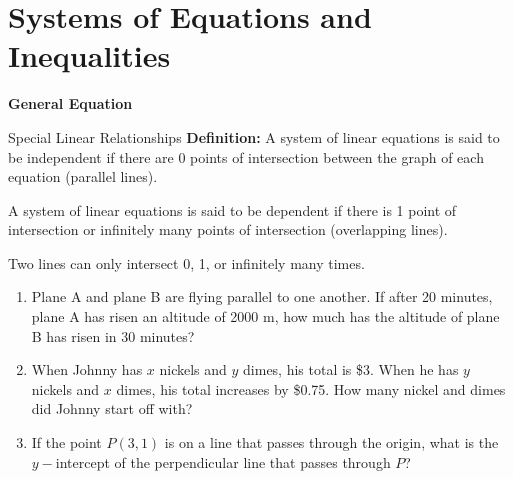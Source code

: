 \section[System of Equations]{Systems of Equations and Inequalities}

\bigskip
\textbf{General Equation}

\bigskip
\begin{equationbox}{Special Linear Relationships}
\textbf{Definition:} A system of linear equations is said to be independent if there are 0 points of intersection between the graph of each equation (parallel lines).

\bigskip
A system of linear equations is said to be dependent if there is 1 point of intersection or infinitely many points of intersection (overlapping lines).

\bigskip
Two lines can only intersect 0, 1, or infinitely many times.
\end{equationbox}
 
\bigskip
\begin{enumerate}[labelindent=*,style=multiline,leftmargin=*,label=\textbf{Example \arabic*:}]
\item Plane A and plane B are flying parallel to one another. If after 20 minutes, plane A has risen an altitude of 2000 m, how much has the altitude of plane B has risen in 30 minutes?

\vfill\item When Johnny has $x$ nickels and $y$ dimes, his total is \$3. When he has $y$ nickels and $x$ dimes, his total increases by \$0.75. How many nickel and dimes did Johnny start off with?

\vfill\item If the point $P(3,1)$ is on a line that passes through the origin, what is the $y-$intercept of the perpendicular line that passes through $P$?
\end{enumerate}

